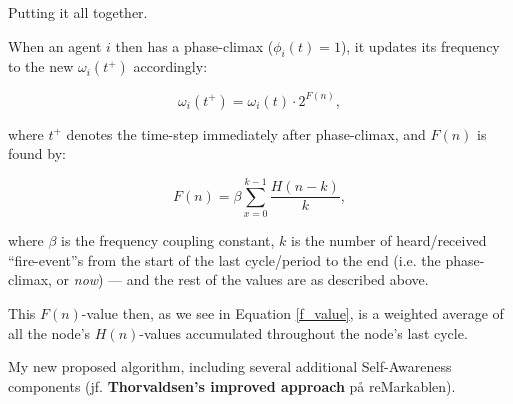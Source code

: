 			Putting it all together.
			
			When an agent $i$ then has a phase-climax ($\phi_i(t)=1$), it updates its frequency to the new $\omega_i(t^+)$ accordingly:
			
			\begin{equation}
			\label{freq_adj}
				\omega_i(t^+) = \omega_i(t) \cdot 2^{F(n)},
			\end{equation}
			
			where $t^+$ denotes the time-step immediately after phase-climax, and $F(n)$ is found by:
			
			\begin{equation}
			\label{f_value}
				F(n) = \beta\sum_{x=0}^{k-1}\frac{H(n-k)}{k},
			\end{equation}
			
			where $\beta$ is the frequency coupling constant, $k$ is the number of heard/received ``fire-event''s from the start of the last cycle/period to the end (i.e. the phase-climax, or \textit{now}) — and the rest of the values are as described above.
			
			This $F(n)$-value then, as we see in Equation \eqref{f_value}, is a weighted average of all the node's $H(n)$-values accumulated throughout the node's last cycle.
			
			
			
			
			
			
			
			
			
			
			My new proposed algorithm, including several additional Self-Awareness components (jf. \textbf{Thorvaldsen's improved approach} på reMarkablen).